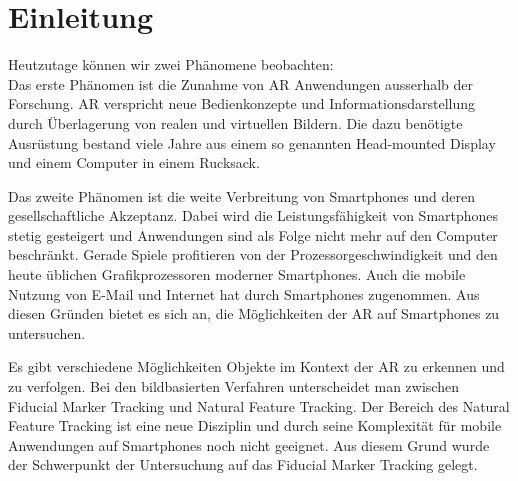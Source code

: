 \chapter{Einleitung} %
\label{cha:einleitung}

Heutzutage können wir zwei Phänomene beobachten:\\Das erste Phänomen ist die Zunahme von \gls{AR} Anwendungen ausserhalb der Forschung. \gls{AR} verspricht neue Bedienkonzepte und Informationsdarstellung durch Überlagerung von realen und virtuellen Bil\-dern. Die dazu benötigte Ausrüstung bestand viele Jahre aus einem so genannten Head-mounted Display und einem Computer in einem Rucksack.

Das zweite Phänomen ist die weite Verbreitung von Smartphones und deren ge\-sell\-schaft\-liche Akzeptanz. Dabei wird die Leistungsfähigkeit von Smartphones stetig ge\-stei\-gert und Anwendungen sind als Folge nicht mehr auf den Computer beschränkt. Gerade Spiele profitieren von der Prozessor\-ge\-schwin\-dig\-keit und den heute üblichen Grafikprozessoren moderner Smartphones. Auch die mobile Nutzung von E-Mail und Internet hat durch Smartphones zugenommen. Aus diesen Gründen bietet es sich an, die Mög\-lich\-kei\-ten der \gls{AR} auf Smartphones zu untersuchen.

Es gibt verschiedene Möglichkeiten Objekte im Kontext der \gls{AR} zu erkennen und zu verfolgen. Bei den bildbasierten Verfahren unterscheidet man zwischen Fiducial Marker Tracking und Natural Feature Tracking. Der Bereich des Natural Feature Tracking ist eine neue Disziplin und durch seine Komplexität für mobile Anwendungen auf Smartphones noch nicht geeignet. Aus diesem Grund wurde der Schwerpunkt der Untersuchung auf das Fiducial Marker Tracking gelegt.





